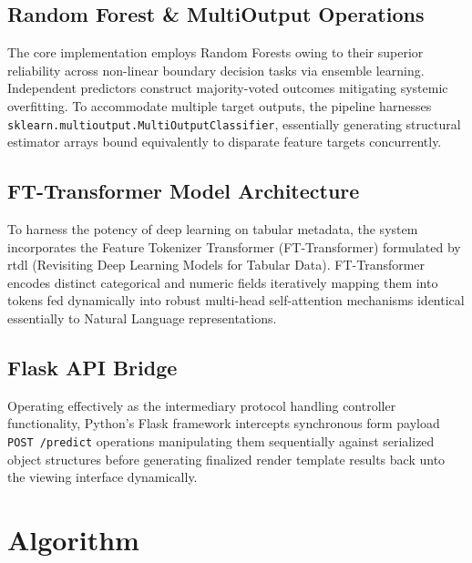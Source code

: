 \documentclass[12pt,a4paper]{report}
\begin{document}
\subsection{Random Forest \& MultiOutput Operations}
The core implementation employs Random Forests owing to their superior reliability across non-linear boundary decision tasks via ensemble learning. Independent predictors construct majority-voted outcomes mitigating systemic overfitting. To accommodate multiple target outputs, the pipeline harnesses \texttt{sklearn.multioutput.MultiOutputClassifier}, essentially generating structural estimator arrays bound equivalently to disparate feature targets concurrently.

\subsection{FT-Transformer Model Architecture}
To harness the potency of deep learning on tabular metadata, the system incorporates the Feature Tokenizer Transformer (FT-Transformer) formulated by rtdl (Revisiting Deep Learning Models for Tabular Data). FT-Transformer encodes distinct categorical and numeric fields iteratively mapping them into tokens fed dynamically into robust multi-head self-attention mechanisms identical essentially to Natural Language representations.

\subsection{Flask API Bridge}
Operating effectively as the intermediary protocol handling controller functionality, Python's Flask framework intercepts synchronous form payload \texttt{POST /predict} operations manipulating them sequentially against serialized object structures before generating finalized render template results back unto the viewing interface dynamically. 

\section{Algorithm}
\end{document}
